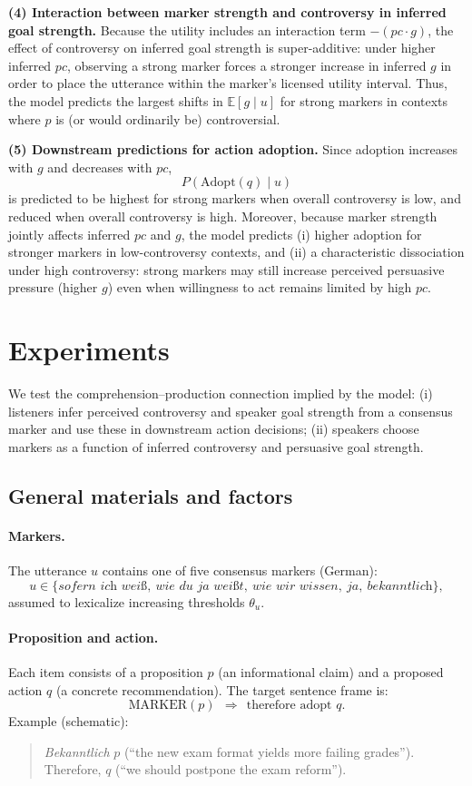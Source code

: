 \documentclass[12pt]{article}
\begin{document}
\textbf{(4) Interaction between marker strength and controversy in inferred goal strength.}
Because the utility includes an interaction term $-(pc\cdot g)$, the effect of controversy on inferred goal strength is super-additive: under higher inferred $pc$, observing a strong marker forces a stronger increase in inferred $g$ in order to place the utterance within the marker's licensed utility interval. Thus, the model predicts the largest shifts in $\mathbb{E}[g \mid u]$ for strong markers in contexts where $p$ is (or would ordinarily be) controversial.

\textbf{(5) Downstream predictions for action adoption.}
Since adoption increases with $g$ and decreases with $pc$,
\[
P(\mathrm{Adopt}(q)\mid u)
\]
is predicted to be highest for strong markers when overall controversy is low, and reduced when overall controversy is high. Moreover, because marker strength jointly affects inferred $pc$ and $g$, the model predicts (i) higher adoption for stronger markers in low-controversy contexts, and (ii) a characteristic dissociation under high controversy: strong markers may still increase perceived persuasive pressure (higher $g$) even when willingness to act remains limited by high $pc$.

\section*{Experiments}

We test the comprehension--production connection implied by the model: (i) listeners infer perceived controversy and speaker goal strength from a consensus marker and use these in downstream action decisions; (ii) speakers choose markers as a function of inferred controversy and persuasive goal strength.

\subsection{General materials and factors}

\paragraph{Markers.}
The utterance $u$ contains one of five consensus markers (German):
\[
u \in \{\textit{sofern ich weiß},\ \textit{wie du ja weißt},\ \textit{wie wir wissen},\ \textit{ja},\ \textit{bekanntlich}\},
\]
assumed to lexicalize increasing thresholds $\theta_u$.

\paragraph{Proposition and action.}
Each item consists of a proposition $p$ (an informational claim) and a proposed action $q$ (a concrete recommendation). The target sentence frame is:
\[
\text{MARKER}(p)\ \ \Rightarrow\ \ \text{therefore adopt } q.
\]
Example (schematic):
\begin{quote}
\small
\textit{Bekanntlich} $p$ (``the new exam format yields more failing grades''). Therefore, $q$ (``we should postpone the exam reform'').
\end{quote}
\end{document}
